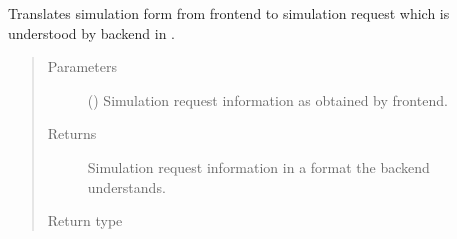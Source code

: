 \documentclass[a4paper,landscape,10pt,english]{sphinxmanual}
\begin{document}

\begin{fulllineitems}
\label{\detokenize{code_docs/simulation_api.controller:simulation_api.controller.tasks._sim_form_to_sim_request}}
Translates simulation form \textendash{}from frontend\textendash{} to simulation request which
is understood by backend in
{\hyperref[\detokenize{code_docs/simulation_api.controller:simulation_api.controller.tasks._api_simulation_request}]{}}.
\begin{quote}\begin{description}
\item[{Parameters}] \leavevmode
{} (\sphinxstyleliteralemphasis{\sphinxupquote{{[}}}\sphinxstyleliteralemphasis{\sphinxupquote{, }}\sphinxstyleliteralemphasis{\sphinxupquote{{]}}}) \textendash{} Simulation request information as obtained by frontend.

\item[{Returns}] \leavevmode
Simulation request information in a format the backend understands.

\item[{Return type}] \leavevmode
{\hyperref[\detokenize{code_docs/simulation_api.controller:simulation_api.controller.schemas.SimRequest}]{}}

\end{description}\end{quote}

\end{fulllineitems}



\paragraph{}
\label{\detokenize{code_docs/simulation_api.model:simulation-api-model}}\label{\detokenize{code_docs/simulation_api.model::doc}}
\end{document}
